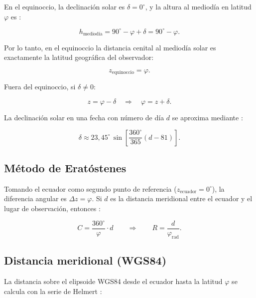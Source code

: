 \documentclass[12pt,a4paper]{article}
\begin{document}
En el equinoccio, la declinación solar es $\delta = 0^\circ$, y la altura
al mediodía en latitud $\varphi$ es \citep{PortillaBarbosa2009}:

\begin{equation}
  h_\text{mediodía} = 90^\circ - \varphi + \delta = 90^\circ - \varphi.
\end{equation}

Por lo tanto, en el equinoccio la distancia cenital al mediodía solar
es exactamente la latitud geográfica del observador:

\begin{equation}
  \boxed{z_\text{equinoccio} = \varphi}.
  \label{eq:equinoccio}
\end{equation}

Fuera del equinoccio, si $\delta \neq 0$:

\begin{equation}
  z = \varphi - \delta \quad \Rightarrow \quad \varphi = z + \delta.
  \label{eq:latitud}
\end{equation}

La declinación solar en una fecha con número de día $d$ se aproxima
mediante \citep{PortillaBarbosa2009}:

\begin{equation}
  \delta \approx 23{,}45^\circ\,\sin\!\left[\frac{360^\circ}{365}(d - 81)\right].
  \label{eq:declinacion}
\end{equation}

\subsection{Método de Eratóstenes}

Tomando el ecuador como segundo punto de referencia ($z_\text{ecuador} = 0^\circ$),
la diferencia angular es $\Delta z = \varphi$.
Si $d$ es la distancia meridional entre el ecuador y el lugar de
observación, entonces \citep{PortillaBarbosa2009,Britannica2024}:

\begin{equation}
  C = \frac{360^\circ}{\varphi} \cdot d \qquad \Longrightarrow \qquad
  \boxed{R = \frac{d}{\varphi_\text{rad}}}.
  \label{eq:radio}
\end{equation}

\subsection{Distancia meridional (WGS84)}

La distancia sobre el elipsoide WGS84 desde el ecuador hasta la
latitud $\varphi$ se calcula con la serie de Helmert
\citep{Torge2001,NGA2014}:
\end{document}
